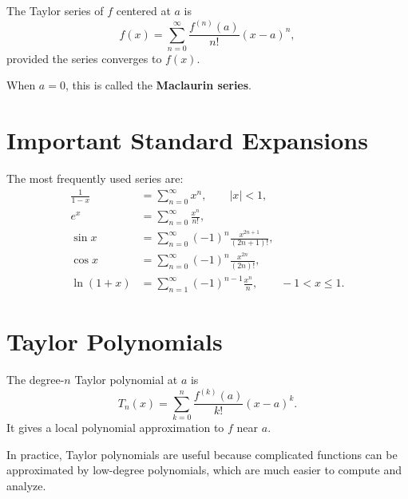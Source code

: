 \begin{definition}
The Taylor series of $f$ centered at $a$ is
$$f(x) = \sum_{n=0}^{\infty} \frac{f^{(n)}(a)}{n!}(x-a)^n,$$
provided the series converges to $f(x)$.
\end{definition}

When $a=0$, this is called the \textbf{Maclaurin series}.

\section*{Important Standard Expansions}

The most frequently used series are:
\begin{align*}
\frac{1}{1-x} &= \sum_{n=0}^{\infty} x^n, \qquad |x|<1, \\
 e^x &= \sum_{n=0}^{\infty} \frac{x^n}{n!}, \\
\sin x &= \sum_{n=0}^{\infty} (-1)^n\frac{x^{2n+1}}{(2n+1)!}, \\
\cos x &= \sum_{n=0}^{\infty} (-1)^n\frac{x^{2n}}{(2n)!}, \\
\ln(1+x) &= \sum_{n=1}^{\infty} (-1)^{n-1}\frac{x^n}{n}, \qquad -1<x\le 1.
\end{align*}

\section*{Taylor Polynomials}

The degree-$n$ Taylor polynomial at $a$ is
$$T_n(x)=\sum_{k=0}^{n}\frac{f^{(k)}(a)}{k!}(x-a)^k.$$ 
It gives a local polynomial approximation to $f$ near $a$.

\begin{remark}
In practice, Taylor polynomials are useful because complicated functions can be approximated by low-degree polynomials, which are much easier to compute and analyze.
\end{remark}